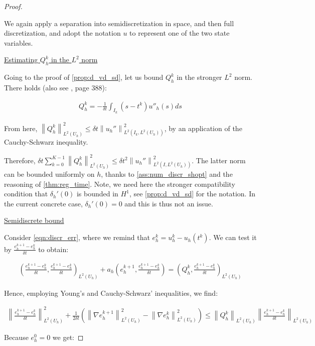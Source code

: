 \documentclass[english,a4paper,10pt,oneside]{scrbook}	%
\theoremstyle{break}
\newenvironment{mproof}[1][\proofname]{%
  \begin{proof}[#1]$ $\par\nobreak\ignorespaces
}{%
  \end{proof}
}
\renewcommand*{\proofname}{Proof}
\theoremstyle{remark}
\newcommand{\ds}{\displaystyle}
\newcommand{\norm}[1]{\left\lVert#1\right\rVert}
\begin{document}
\begin{mproof}
We again apply a separation into semidiscretization in space, and then full discretization, and adopt the notation $u$ to represent one of the two state variables.

\underline{Estimating $Q_h^k$ in the $L^2$ norm}

Going to the proof of \cref{prop:d_vd_sd}, let us bound $Q_h^k$ in the stronger $L^2$ norm. There holds (also see \cite{quarteroni}, page 388):

\begin{align*}
	Q_h^k = -\frac{1}{\delta t}\int_{I_k}(s-t^k)u''_h(s)ds
\end{align*}

From here, $\norm{Q_h^k}_{L^2(U_h)}^2\leq \delta t \norm{u_h''}_{L^2(I_k,{L^2(U_h)})}^2$, by an application of the Cauchy-Schwarz inequality. 

Therefore, $\delta t \sum_{k=0}^{K-1} \norm{Q_h^k}_{L^2(U_h)}^2\leq \delta t^2 \norm{u_h''}_{L^2(I,{L^2(U_h)})}^2$. The latter norm can be bounded uniformly on $h$, thanks to \cref{ass:num_discr_shopt} and the reasoning of \cref{thm:reg_time}. Note, we need here the stronger compatibility condition that $\delta_h'(0)$ is bounded in $H^1$, see \cref{prop:d_vd_sd} for the notation. In the current concrete case, $\delta_h'(0) = 0$ and this is thus not an issue.

\underline{Semidiscrete bound}

Consider \cref{eqn:discr_err}, where we remind that $e_h^k = u_h^k-u_h(t^k)$. We can test it by $\ds \frac{e_h^{k+1}-e_h^k}{\delta t}$ to obtain:

\begin{align*}
\left ( \frac{e_{h}^{k+1}-e_h^k}{\delta t}, \frac{e_{h}^{k+1}-e_h^k}{\delta t}\right)_{L^2(U_h)} + a_h \left (e_h^{k+1}, \frac{e_{h}^{k+1}-e_h^k}{\delta t} \right ) = \left ( Q_h^k,\frac{e_{h}^{k+1}-e_h^k}{\delta t}\right)_{L^2(U_h)}
\end{align*}

Hence, employing Young's and Cauchy-Schwarz' inequalities, we find:

\begin{align*}
\norm{ \frac{e_{h}^{k+1}-e_h^k}{\delta t}}_{L^2(U_h)}^2 + \frac{1}{2\delta t}(\norm{\nabla e_h^{k+1}}^2_{L^2(U_h)} - \norm{\nabla e_h^k}^2_{L^2(U_h)})\leq  \norm{Q_h^k}_{L^2(U_h)} \norm{\frac{e_{h}^{k+1}-e_h^k}{\delta t}}_{L^2(U_h)}
\end{align*}

Because $e_h^0=0$ we get:


\end{mproof}
\end{document}
